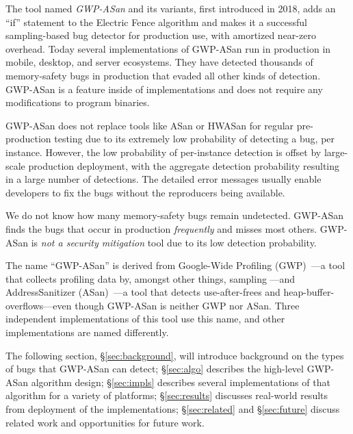 The tool named \emph{GWP-ASan} and its variants, first introduced in 2018, adds
an ``if'' statement to the Electric Fence algorithm and makes it a successful
sampling-based bug detector for production use, with amortized near-zero
overhead. Today several implementations of GWP-ASan run in production in
mobile, desktop, and server ecosystems. They have detected thousands of
memory-safety bugs in production that evaded all other kinds of detection.
GWP-ASan is a feature inside of  implementations and does
not require any modifications to program binaries.

GWP-ASan does not replace tools like ASan or HWASan for regular pre-production
testing due to its extremely low probability of detecting a bug, per instance.
However, the low probability of per-instance detection is offset by large-scale
production deployment, with the aggregate detection probability resulting in a
large number of detections. The detailed error messages usually enable
developers to fix the bugs without the reproducers being available.

We do not know how many memory-safety bugs remain undetected. GWP-ASan finds
the bugs that occur in production \emph{frequently} and misses most others.
GWP-ASan is \emph{not a security mitigation} tool due to its low detection
probability.

The name ``GWP-ASan'' is derived from Google-Wide Profiling
(GWP)~\cite{RenTMSRH2010}---a tool that collects profiling data by, amongst
other things, sampling ---and AddressSanitizer
(ASan)~\cite{SerebryanyBPV2012}---a tool that detects use-after-frees and
heap-buffer-overflows---even though GWP-ASan is neither GWP nor ASan. Three
independent implementations of this tool use this name, and other
implementations are named differently.

 The following section, \S\ref{sec:background},
will introduce background on the types of bugs that GWP-ASan can detect;
\S\ref{sec:algo} describes the high-level GWP-ASan algorithm design;
\S\ref{sec:impls} describes several implementations of that algorithm for a
variety of platforms; \S\ref{sec:results} discusses real-world results from
deployment of the implementations; \S\ref{sec:related} and \S\ref{sec:future}
discuss related work and opportunities for future work.
